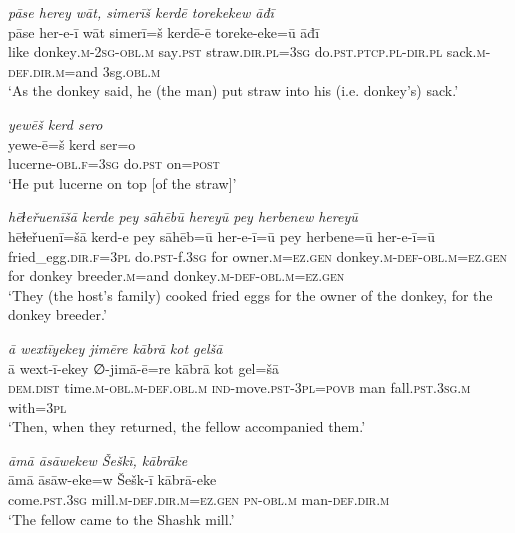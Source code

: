 \ea \label{HB.54}
\textit{pāse herey wāt, simerīš kerdē torekekew āđī} \\ 
\gll pāse her-e-ī wāt simerī=š kerdē-ē toreke-eke=ū āđī \\ 
 like donkey\textsc{.m}-\textsc{2sg}\textsc{-obl}\textsc{.m} say\textsc{.pst} straw\textsc{.dir}\textsc{.pl}\textsc{=3sg} do\textsc{.pst}\textsc{.ptcp}\textsc{.pl}\textsc{-dir}\textsc{.pl} sack\textsc{.m}\textsc{-def}\textsc{.dir}\textsc{.m}=and 3sg\textsc{.obl}\textsc{.m} \\ 
\glt `As the donkey said, he (the man) put straw into his (i.e. donkey’s) sack.'
\z 
 
\ea \label{HB.55}
\textit{yewēš kerd sero} \\ 
\gll yewe-ē=š kerd ser=o \\ 
 lucerne\textsc{-obl}\textsc{\textsc{.f}}\textsc{=3sg} do\textsc{.pst} on\textsc{=\textsc{post}} \\ 
\glt `He put lucerne on top [of the straw]'
\z 
 
\ea \label{HB.56}
\textit{hēɫeřuenīšā kerde pey sāhēbū hereyū pey herbenew hereyū} \\ 
\gll hēɫeřuenī=šā kerd-e pey sāhēb=ū her-e-ī=ū pey herbene=ū her-e-ī=ū \\ 
 fried\_egg\textsc{.dir}\textsc{\textsc{.f}}\textsc{=3pl} do\textsc{.pst}-f\textsc{.3sg} for owner\textsc{.m}\textsc{=ez}\textsc{.gen} donkey\textsc{.m}\textsc{-def}\textsc{-obl}\textsc{.m}\textsc{=ez}\textsc{.gen} for donkey breeder\textsc{.m}=and donkey\textsc{.m}\textsc{-def}\textsc{-obl}\textsc{.m}\textsc{=ez}\textsc{.gen} \\ 
\glt `They (the host’s family) cooked fried eggs for the owner of the donkey, for the donkey breeder.'
\z 
 
\ea \label{HB.59}
\textit{ā wextīyekey jimēre kābrā kot gelšā} \\ 
\gll ā wext-ī-ekey ∅-jimā-ē=re kābrā kot gel=šā \\ 
 \textsc{dem.dist} time\textsc{.m}\textsc{-obl}\textsc{.m}\textsc{-def}\textsc{.obl}\textsc{.m} \textsc{ind-}move\textsc{.pst}\textsc{-3pl}\textsc{=\textsc{povb}} man fall\textsc{.pst}\textsc{.3sg}\textsc{.m} with\textsc{=3pl} \\ 
\glt `Then, when they returned, the fellow accompanied them.'
\z 
 
\ea \label{HB.60}
\textit{āmā āsāwekew Šeškī, kābrāke} \\ 
\gll āmā āsāw-eke=w Šešk-ī kābrā-eke \\ 
 come\textsc{.pst}\textsc{.3sg} mill\textsc{.m}\textsc{-def}\textsc{.dir}\textsc{.m}\textsc{=ez}\textsc{.gen} \textsc{pn}\textsc{-obl}\textsc{.m} man\textsc{-def}\textsc{.dir}\textsc{.m} \\ 
\glt `The fellow came to the Shashk mill.'
\z 
 
